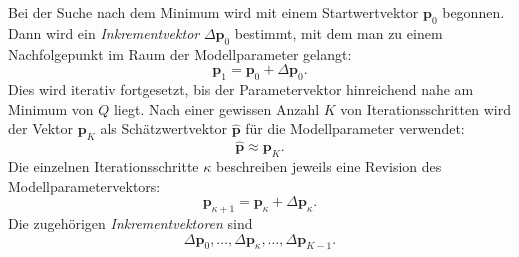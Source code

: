 Bei der Suche nach dem Minimum wird mit einem Startwertvektor $\mathbf{p}_0$ begonnen. Dann wird
ein \textsl{Inkrementvektor} $\Delta \mathbf{p}_0$ bestimmt, mit dem man zu einem Nachfolgepunkt im Raum
der Modellparameter gelangt:
\begin{equation}
\mathbf{p}_1
=
\mathbf{p}_0
+
\Delta \mathbf{p}_0.
\end{equation}
Dies wird iterativ fortgesetzt, bis der Parametervektor hinreichend nahe am Minimum von $Q$
liegt. Nach einer gewissen Anzahl $K$ von Iterationsschritten wird der Vektor
$\mathbf{p}_K$ als Schätzwertvektor $\hat{\mathbf{p}}$ für die Modellparameter verwendet:
\begin{equation}
\hat{\mathbf{p}}
\approx
\mathbf{p}_K.
\end{equation}
Die einzelnen Iterationsschritte $\kappa$ beschreiben jeweils eine Revision des
Modellparametervektors:
\begin{equation}
\mathbf{p}_{\kappa+1}
=
\mathbf{p}_{\kappa}
+
\Delta \mathbf{p}_{\kappa}.
\label{Revisionsschritt}
\end{equation}
Die zugehörigen \textsl{Inkrementvektoren} sind
$$
\Delta \mathbf{p}_0,\dots,\Delta \mathbf{p}_{\kappa},\dots,\Delta \mathbf{p}_{K-1}.
$$

